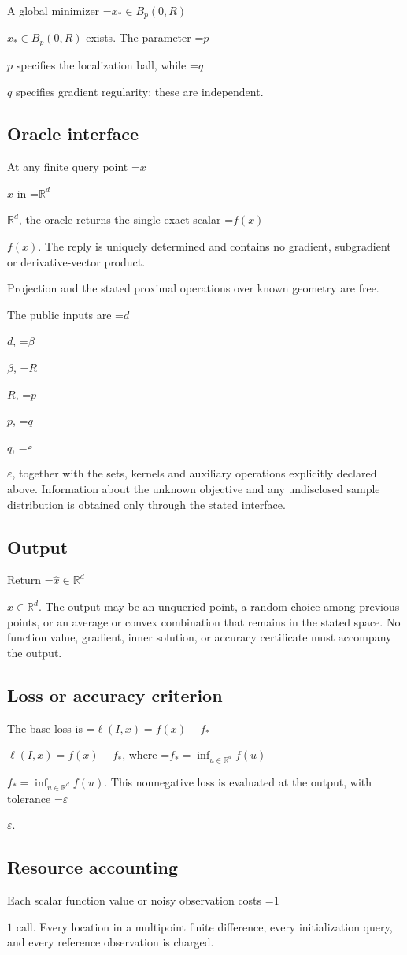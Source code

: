 \documentclass[10pt,a4paper]{article}
\newcommand{\AtlasMath}[1]{\par\begingroup\centering\setbox0=\hbox{$\displaystyle #1$}\ifdim\wd0>1.4\linewidth\typeout{ATLAS WIDE FORMULA: \the\wd0}\fi\ifdim\wd0>\linewidth\resizebox{\linewidth}{!}{\box0}\else\box0\fi\par\endgroup}
\newcommand{\AtlasInlineMath}[1]{\begingroup\setbox0=\hbox{$#1$}\ifdim\wd0>.4\linewidth\endgroup\AtlasMath{#1}\else\endgroup$#1$\fi}
\begin{document}
A global minimizer \AtlasInlineMath{x_*\in B_p(0,R)} exists. The parameter \AtlasInlineMath{p} specifies the localization ball, while \AtlasInlineMath{q} specifies gradient regularity; these are independent.

\subsection{Oracle interface}
At any finite query point \AtlasInlineMath{x} in \AtlasInlineMath{\mathbb{R}^d}, the oracle returns the single exact scalar \AtlasInlineMath{f(x)}. The reply is uniquely determined and contains no gradient, subgradient or derivative-vector product.

Projection and the stated proximal operations over known geometry are free.

The public inputs are \AtlasInlineMath{d}, \AtlasInlineMath{\beta}, \AtlasInlineMath{R}, \AtlasInlineMath{p}, \AtlasInlineMath{q}, \AtlasInlineMath{\varepsilon}, together with the sets, kernels and auxiliary operations explicitly declared above. Information about the unknown objective and any undisclosed sample distribution is obtained only through the stated interface.

\subsection{Output}
Return \AtlasInlineMath{\widehat{x}\in \mathbb{R}^d}. The output may be an unqueried point, a random choice among previous points, or an average or convex combination that remains in the stated space. No function value, gradient, inner solution, or accuracy certificate must accompany the output.

\subsection{Loss or accuracy criterion}
The base loss is \AtlasInlineMath{\ell(I,x)=f(x)-f_*}, where \AtlasInlineMath{f_*=\inf_{u\in \mathbb{R}^d}f(u)}. This nonnegative loss is evaluated at the output, with tolerance \AtlasInlineMath{\varepsilon}.

\subsection{Resource accounting}
Each scalar function value or noisy observation costs \AtlasInlineMath{1} call. Every location in a multipoint finite difference, every initialization query, and every reference observation is charged.
\end{document}
